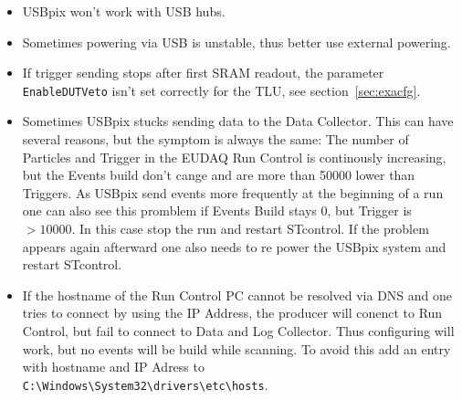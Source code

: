\documentclass[a4paper,12pt]{article}
\begin{document}
\begin{itemize}
\item USBpix won't work with USB hubs.
\item Sometimes powering via USB is unstable, thus better use external powering.
\item If trigger sending stops after first SRAM readout, the parameter {\tt EnableDUTVeto}
isn't set correctly for the TLU, see section~\ref{sec:exacfg}.
\item Sometimes USBpix stucks sending data to the Data Collector. This can have
several reasons, but the symptom is always the same: The number of Particles
and Trigger in the EUDAQ Run Control is continously increasing, but the Events
build don’t cange and are more than 50000 lower than Triggers. As USBpix send
events more frequently at the beginning of a run one can also see this promblem if
Events Build stays 0, but Trigger is $> 10000$. In this case stop the run and restart
STcontrol. If the problem appears again afterward one also needs to re power the
USBpix system and restart STcontrol.
\item If the hostname of the Run Control PC cannot be resolved via DNS and one tries
to connect by using the IP Address, the producer will conenct to Run Control,
but fail to connect to Data and Log Collector. Thus configuring will work, but
no events will be build while scanning. To avoid this add an entry with hostname
and IP Adress to \\
{\tt C:\textbackslash Windows\textbackslash System32\textbackslash drivers\textbackslash etc\textbackslash hosts}.
\end{itemize}
\end{document}
